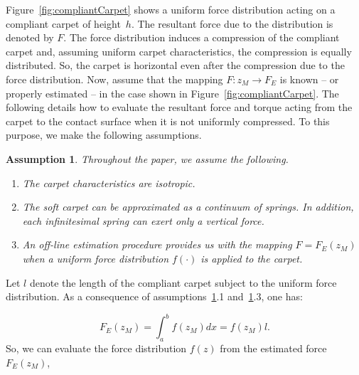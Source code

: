 \documentclass[12pt,a4paper,twoside]{article}
\newtheorem{assumption}{\bf{Assumption}}
\begin{document}
Figure~\ref{fig:compliantCarpet} shows a uniform force distribution acting on a compliant carpet of height~$h$. The resultant force due to the distribution is denoted by $F$. The force distribution induces a compression of the compliant carpet and, assuming uniform carpet characteristics, the  compression is equally distributed. So,  the carpet is horizontal even after the compression due to the force distribution. Now, assume that the mapping $F: z_M \rightarrow F_E$ is known -- or properly estimated --  in the case shown in Figure~\ref{fig:compliantCarpet}. The following details how to evaluate the resultant force and torque acting from the carpet to the contact surface  when it is not uniformly compressed. To this purpose, we make the following assumptions.

 \begin{figure}[t]
\end{figure}



\begin{assumption}
\label{hp:uniformity} 
Throughout the paper, we assume the following.
\begin{enumerate}
    \item The carpet characteristics are isotropic.
    \item The soft carpet can be approximated as a continuum of springs. In addition, each infinitesimal spring can  exert only a vertical force.
    \item An off-line estimation procedure provides us with the mapping $F = F_E(z_M)$ when a uniform force distribution $f(\cdot)$ is applied to the carpet.
\end{enumerate}
\end{assumption}

Let $l$ denote the length of the compliant carpet subject to the uniform force distribution. As a consequence of assumptions~\ref{hp:uniformity}.1 and~\ref{hp:uniformity}.3, one has:

\begin{equation}
\label{forceFromIntegral}
F_E(z_M) = \int_{a}^{b} f(z_M) dx = f(z_M) l.
\end{equation}
So, we can evaluate the force distribution $f(z)$ from the estimated force $F_E(z_M)$, 
\end{document}
